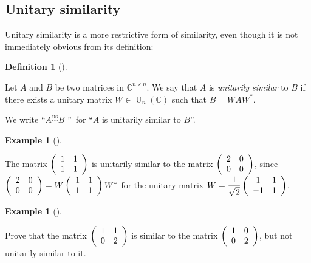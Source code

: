 \documentclass[numbers=enddot,12pt,final,onecolumn,notitlepage]{scrartcl}%
\numberwithin{exer}{subsection}
\theoremstyle{definition}
\newtheorem{defi}[theo]{Definition}
\newenvironment{definition}[1][]
{\begin{defi}[#1]\begin{leftbar}}
{\end{leftbar}\end{defi}}
\newtheorem{exam}[theo]{Example}
\newenvironment{example}[1][]
{\begin{exam}[#1]\begin{leftbar}}
{\end{leftbar}\end{exam}}
\begin{document}
\subsection{Unitary similarity}

Unitary similarity is a more restrictive form of similarity, even though it is
not immediately obvious from its definition:

\begin{definition}
\label{def.schurtri.unisim.def}Let $A$ and $B$ be two matrices in
$\mathbb{C}^{n\times n}$. We say that $A$ is \emph{unitarily similar} to $B$
if there exists a unitary matrix $W\in\operatorname*{U}\nolimits_{n}\left(
\mathbb{C}\right)  $ such that $B=WAW^{\ast}$.

We write \textquotedblleft$A\overset{\operatorname*{us}}{\sim}B$%
\textquotedblright\ for \textquotedblleft$A$ is unitarily similar to
$B$\textquotedblright.
\end{definition}

\begin{example}
The matrix $\left(
\begin{array}
[c]{cc}%
1 & 1\\
1 & 1
\end{array}
\right)  $ is unitarily similar to the matrix $\left(
\begin{array}
[c]{cc}%
2 & 0\\
0 & 0
\end{array}
\right)  $, since $\left(
\begin{array}
[c]{cc}%
2 & 0\\
0 & 0
\end{array}
\right)  =W\left(
\begin{array}
[c]{cc}%
1 & 1\\
1 & 1
\end{array}
\right)  W^{\ast}$ for the unitary matrix $W=\dfrac{1}{\sqrt{2}}\left(
\begin{array}
[c]{cc}%
1 & 1\\
-1 & 1
\end{array}
\right)  $.
\end{example}

\begin{example}
\label{exe.schurtri.unisim.two2x2} Prove that the matrix $\left(
\begin{array}
[c]{cc}%
1 & 1\\
0 & 2
\end{array}
\right)  $ is similar to the matrix $\left(
\begin{array}
[c]{cc}%
1 & 0\\
0 & 2
\end{array}
\right)  $, but not unitarily similar to it.
\end{example}
\end{document}
